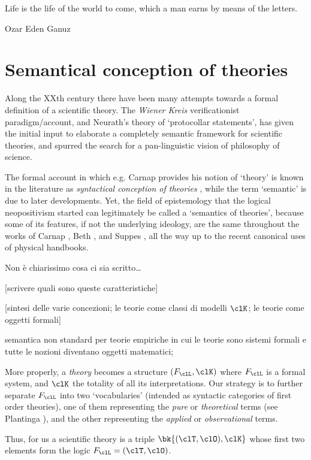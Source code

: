 \epigraph{Life is the life of the world to come, which a man earns by means of the letters.}{Ozar Eden Ganuz}
\section{Semantical conception of theories}
Along the XXth century there have been many attempts towards a formal definition of a scientific theory. The \emph{Wiener Kreis} verificationist paradigm/account, and Neurath's theory of `protocollar statements', has given the initial input to elaborate a completely semantic framework for scientific theories, and spurred the search for a pan-linguistic vision of philosophy of science.

The formal account in which e.g. Carnap \cite{?} provides his notion of `theory' is known in the literature as \emph{syntactical conception of theories} \cite{?}, while the term `semantic' is due to later developments. Yet, the field of epistemology that the logical neopositivism started can legitimately be called a `semantics of theories', because some of its features, if not the underlying ideology, are the same throughout the works of Carnap \cite{?},  Beth \cite{?}, and Suppes \cite{?}, all the way up to the recent canonical uses of physical handbooks.

{\color{red} Non è chiarissimo cosa ci sia scritto\dots}

	[scrivere quali sono queste caratteristiche]

	[sintesi delle varie concezioni; le teorie come classi di modelli $\clK$;
		le teorie come oggetti formali]

semantica non standard per teorie empiriche in cui le teorie sono sistemi formali e tutte le nozioni diventano oggetti matematici; 

More properly, a \emph{theory} becomes a structure $(F_\clL, \clK)$ where $F_\clL$ is a formal system, and $\clK$ the totality of all its interpretations. Our strategy is to further separate $F_\clL$ into two `vocabularies' (intended as syntactic categories of first order theories), one of them representing the \emph{pure} or \emph{theoretical} terms (see Plantinga \cite{}), and the other representing the \emph{applied} or \emph{observational} terms. 

Thus, for us a scientific theory is a triple $\bk{(\clT,\clO), \clK}$ whose first two elements form the logic $F_\clL=(\clT,\clO)$.%

